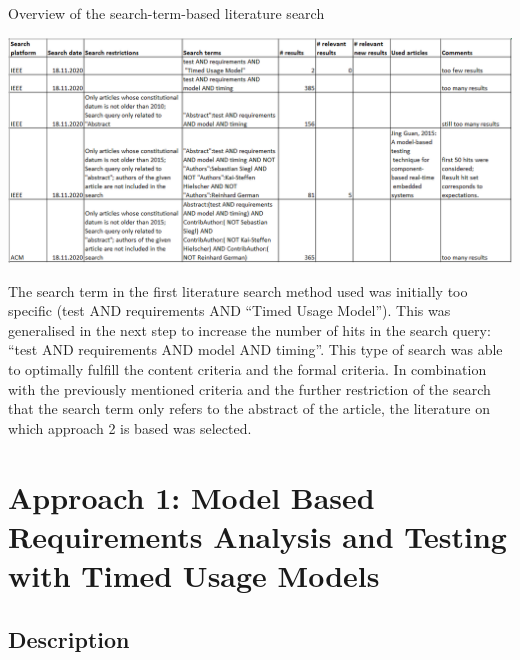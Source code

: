 \begin{table}[h]
	\centering
	\caption{Overview of the search-term-based literature search}
	\includegraphics[scale=0.8]{../images/SearchTermTable} 
\end{table}
The search term in the first literature search method used was initially
too specific (test AND requirements AND \enquote{Timed Usage
Model}). This was generalised in the next step to increase
the number of hits in the search query: \enquote{test AND requirements
AND model AND timing}. This type of search was able to
optimally fulfill the content criteria and the formal criteria. In
combination with the previously mentioned criteria and the further
restriction of the search that the search term only refers to the
abstract of the article, the literature on which approach 2 is based
was selected.

\section{Approach 1: Model Based Requirements Analysis and Testing with Timed
Usage Models\label{sec:Approach-1}}

\subsection{Description}

